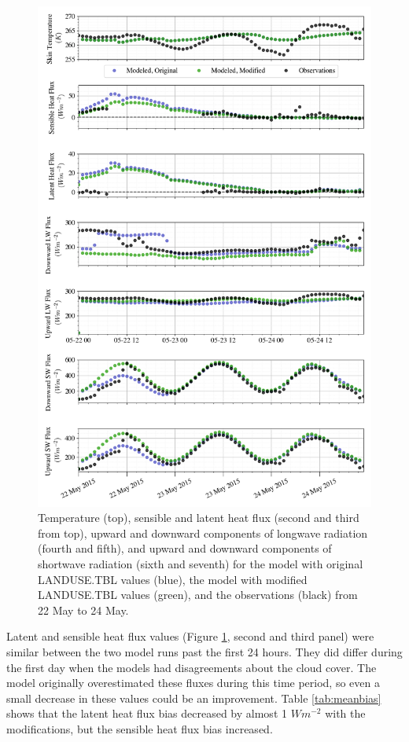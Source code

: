 \begin{figure}[p]
    \centering
        \vspace*{-3cm}
    \includegraphics[width=1\linewidth]{figures/chapter6/case3_all_new.png}
    \caption[Idealized Case 3]{Temperature (top), sensible and latent heat flux (second and third from top), upward and downward components of longwave radiation (fourth and fifth), and upward and downward components of shortwave radiation (sixth and seventh) for the model with original LANDUSE.TBL values (blue), the model with modified LANDUSE.TBL values (green), and the observations (black) from 22 May to 24 May.}
    \label{fig:c3}
\end{figure}

Latent and sensible heat flux values (Figure \ref{fig:c3}, second and third panel) were similar between the two model runs past the first 24 hours. They did differ during the first day when the models had disagreements about the cloud cover. The model originally overestimated these fluxes during this time period, so even a small decrease in these values could be an improvement. Table \ref{tab:meanbias} shows that the latent heat flux bias decreased by almost 1 $Wm^{-2}$ with the modifications, but the sensible heat flux bias increased. 

